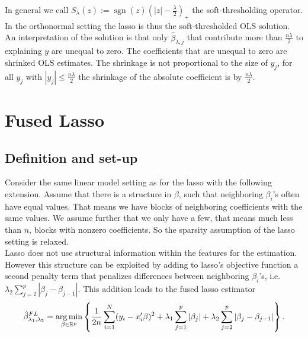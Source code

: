 \documentclass{article}
\theoremstyle{definition}
\DeclareMathOperator*{\argmin}{arg\,min}
\DeclareMathOperator*{\sgn}{sgn}
\begin{document}
\noindent In general we call $S_\lambda(z) := \sgn(z)(|z|-\frac{\lambda}{2})_+$ the soft-thresholding operator. In the orthonormal setting the lasso is thus the soft-thresholded OLS solution.
An interpretation of the solution is that only $\hat\beta_{\lambda,j}$ that contribute more than $\frac{n\lambda}{2}$ to explaining $y$ are unequal to zero. The coefficients that are unequal to zero are shrinked OLS estimates. The shrinkage is not proportional to the size of $y_j$, for all $y_j$ with $|y_j|\leq \frac{n\lambda}{2}$ the shrinkage of the absolute coefficient is by $\frac{n\lambda}{2}$.
\bigskip
{}

\section{Fused Lasso}

\subsection{Definition and set-up}

Consider the same linear model setting as for the lasso with the following extension. Assume that there is a structure in $\beta$, such that neighboring $\beta_i$'s often have equal values. That means we have blocks of neighboring coefficients with the same values. We assume further that we only have a few, that means much less than $n$, blocks with nonzero coefficients. So the sparsity assumption of the lasso setting is relaxed.\\
Lasso does not use structural information within the features for the estimation. However this structure can be exploited by adding to lasso's objective function a second penalty term that penalizes differences between neighboring $\beta_i$'s, i.e. $\lambda_2\sum_{j=2}^p|\beta_j- \beta_{j-1}|$. This addition leads to the fused lasso estimator 
	\begin{equation}\label{eq: fusedlasso}
		\hat{\beta}_{\lambda_1,\lambda_2}^{FL}=\argmin_{\beta \in\rm \mathbb{R}^p} \left\{ \frac{1}{2n}  \sum_{i=1}^{N}(y_{i}-x_{i}'\beta)^2+\lambda_1 \sum_{j=1}^p|\beta_j|+ \lambda_2 \sum_{j=2}^p|\beta_j- \beta_{j-1}| \right \}.
	\end{equation}
\end{document}
